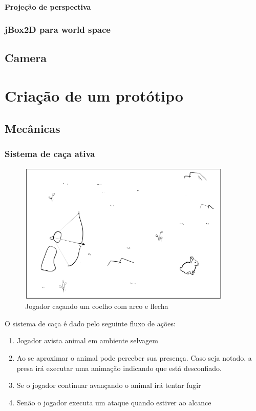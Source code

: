 \documentclass[12pt, 
openright, 
oneside, 
a4paper,    
brazil]{facom-ufu-abntex2}
\begin{document}
\subsubsection{Projeção de perspectiva}

\subsection{jBox2D para world space}

\section{Camera}

\chapter{Criação de um protótipo}
\label{sec:desenv}
\section{Mecânicas}
\subsection{Sistema de caça ativa}
\begin{figure}[H]
	\centering
	\includegraphics[width=4in]{imagens/mecanica_caca.png}
	\caption{Jogador caçando um coelho com arco e flecha}
\end{figure}
O sistema de caça é dado pelo seguinte fluxo de ações:
\begin{enumerate}  
\item Jogador avista animal em ambiente selvagem 
\item Ao se aproximar o animal pode perceber sua presença. Caso seja notado, a presa irá executar uma animação indicando que está desconfiado.
\item Se o jogador continuar avançando o animal irá tentar fugir 
\item Senão o jogador executa um ataque quando estiver ao alcance 
\end{enumerate}
\end{document}
